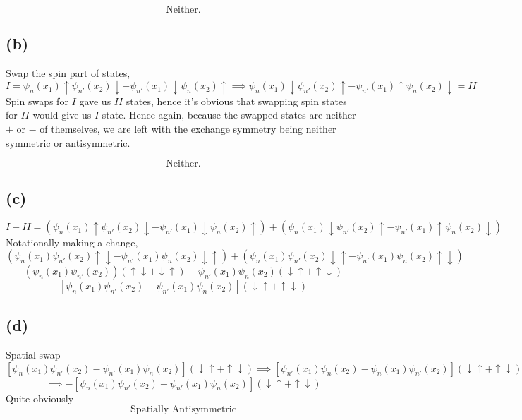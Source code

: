 \documentclass[a4paper]{article}
\begin{document}
\[
\boxed{
\text{Neither.}
}
\] 


\subsection*{(b)}
Swap the spin part of states,
\[
	I = \psi_n(x_1) \uparrow  \psi_{n'} (x_2) \downarrow 
	- 
	\psi_{n'}(x_1) \downarrow \psi_n (x_2) \uparrow 
	\implies 
	\psi_n(x_1) \downarrow  \psi_{n'} (x_2) \uparrow 
	- 
	\psi_{n'}(x_1) \uparrow \psi_n (x_2) \downarrow  = I I 
\]
Spin swaps for $I$ gave us $I I $ states, hence it's obvious that swapping spin states for $I I $ would give us $I$ state. Hence again, because the swapped states are neither $+$ or $-$ of themselves, we are left with the exchange symmetry being neither symmetric or antisymmetric.

\[
\boxed{
\text{Neither.}
}
\]


\subsection*{(c)}
	\[ 
		I + I I = 
		\left( 
			\psi_n(x_1) \uparrow  \psi_{n'} (x_2) \downarrow 
	- 
	\psi_{n'}(x_1) \downarrow \psi_n (x_2) \uparrow  \right) 
	+ \left(\psi_n(x_1) \downarrow  \psi_{n'} (x_2) \uparrow 
	- 
	\psi_{n'}(x_1) \uparrow \psi_n (x_2) \downarrow  \right) 
\]
Notationally making a change, 
		\[ 
			\left( 
			\psi_n(x_1)   \psi_{n'} (x_2) \uparrow \downarrow 
	- 
	\psi_{n'}(x_1) \psi_n (x_2) \downarrow \uparrow  \right) 
	+ \left(\psi_n(x_1) \psi_{n'} (x_2) \downarrow \uparrow 
	- 
	\psi_{n'}(x_1) \psi_n (x_2) \uparrow \downarrow  \right)  
\] 
		\[ 
			\left( 
			\psi_n(x_1)   \psi_{n'} (x_2) \right) (\uparrow \downarrow  + \downarrow \uparrow)
	- 
	\psi_{n'}(x_1) \psi_n (x_2) (\downarrow \uparrow  
	+ \uparrow \downarrow  )
\] 
		\[\boxed{
			\left[ 
			\psi_n(x_1)   \psi_{n'} (x_2) - 
			\psi_{n'}(x_1) \psi_n (x_2) \right] (\downarrow \uparrow  
		+ \uparrow \downarrow  )
	}
\] 


\subsection*{(d)} 
Spatial swap 
\[
			\left[ 
			\psi_n(x_1)   \psi_{n'} (x_2) - 
			\psi_{n'}(x_1) \psi_n (x_2) \right] (\downarrow \uparrow  
		+ \uparrow \downarrow  )
			\implies 
			\left[ 
				\psi_{n'}(x_1)   \psi_{n} (x_2) - 
			\psi_{n}(x_1) \psi_{n'} (x_2) \right] (\downarrow \uparrow  
		+ \uparrow \downarrow  )
\] 
\[
\implies 
			- \left[ 
			\psi_n(x_1)   \psi_{n'} (x_2) - 
			\psi_{n'}(x_1) \psi_n (x_2) \right] (\downarrow \uparrow  
		+ \uparrow \downarrow  )
\]
Quite obviously
\[
\boxed{
\text{Spatially Antisymmetric}
}\] 
\end{document}
